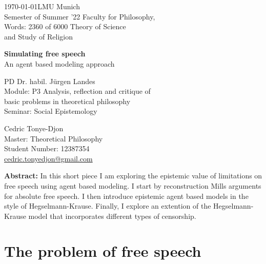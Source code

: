 \documentclass{essay-formal}
\begin{document}
\begin{titlepage}
  \thispagestyle{empty}

  {\noindent\Large \today \hfill LMU Munich\\}
  Semester of Summer '22 \hfill Faculty for Philosophy,\\
  Words: 2360 of 6000 \hfill Theory of Science\\
  \raggedleft and Study of Religion
    
    
  \vfill
  \begin{center}
      \noindent \textbf{{\Huge Simulating free speech\\}}
      \vspace{.5em}
      {\Large An agent based modeling approach}
  \end{center}
    
  \vfill

  \begin{center}
      {\noindent\Large PD Dr. habil. Jürgen Landes\\}
      Module: P3 Analysis, reflection and critique of\\ 
      basic problems in theoretical philosophy\\
      Seminar: Social Epistemology

      \vspace{3em}

      {\noindent \Large Cedric Tonye-Djon\\}
      Master: Theoretical Philosophy\\
      Student Number: 12387354\\
      \href{mailto:cedric.tonyedjon@gmail.com}{cedric.tonyedjon@gmail.com}
  \end{center}
    
\end{titlepage}

\tableofcontents
\clearpage


\textbf{Abstract:} In this short piece I am exploring the epistemic value of limitations on free speech using agent based modeling. I start by reconstruction Mills arguments for absolute free speech. I then introduce epistemic agent based models in the style of Hegselmann-Krause. Finally, I explore an extention of the Hegselmann-Krause model that incorporates different types of censorship.

\section{The problem of free speech}
\end{document}
